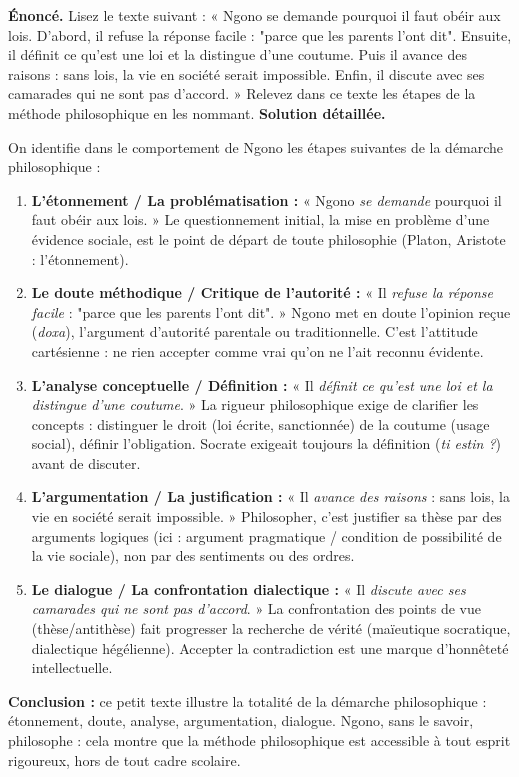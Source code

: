 \documentclass[11pt]{article}
\begin{document}
\begin{exoresolu}
\textbf{Énoncé.} Lisez le texte suivant : « Ngono se demande pourquoi il faut obéir aux lois. D'abord, il refuse la réponse facile : "parce que les parents l'ont dit". Ensuite, il définit ce qu'est une loi et la distingue d'une coutume. Puis il avance des raisons : sans lois, la vie en société serait impossible. Enfin, il discute avec ses camarades qui ne sont pas d'accord. » Relevez dans ce texte les étapes de la méthode philosophique en les nommant.
\tcblower
\textbf{Solution détaillée.}

On identifie dans le comportement de Ngono les étapes suivantes de la démarche philosophique :
\begin{enumerate}
\item \textbf{L'étonnement / La problématisation :} « Ngono \emph{se demande} pourquoi il faut obéir aux lois. » Le questionnement initial, la mise en problème d'une évidence sociale, est le point de départ de toute philosophie (Platon, Aristote : l'étonnement).
\item \textbf{Le doute méthodique / Critique de l'autorité :} « Il \emph{refuse la réponse facile} : "parce que les parents l'ont dit". » Ngono met en doute l'opinion reçue (\emph{doxa}), l'argument d'autorité parentale ou traditionnelle. C'est l'attitude cartésienne : ne rien accepter comme vrai qu'on ne l'ait reconnu évidente.
\item \textbf{L'analyse conceptuelle / Définition :} « Il \emph{définit ce qu'est une loi et la distingue d'une coutume}. » La rigueur philosophique exige de clarifier les concepts : distinguer le droit (loi écrite, sanctionnée) de la coutume (usage social), définir l'obligation. Socrate exigeait toujours la définition (\emph{ti estin ?}) avant de discuter.
\item \textbf{L'argumentation / La justification :} « Il \emph{avance des raisons} : sans lois, la vie en société serait impossible. » Philosopher, c'est justifier sa thèse par des arguments logiques (ici : argument pragmatique / condition de possibilité de la vie sociale), non par des sentiments ou des ordres.
\item \textbf{Le dialogue / La confrontation dialectique :} « Il \emph{discute avec ses camarades qui ne sont pas d'accord}. » La confrontation des points de vue (thèse/antithèse) fait progresser la recherche de vérité (maïeutique socratique, dialectique hégélienne). Accepter la contradiction est une marque d'honnêteté intellectuelle.
\end{enumerate}
\textbf{Conclusion :} ce petit texte illustre la totalité de la démarche philosophique : étonnement, doute, analyse, argumentation, dialogue. Ngono, sans le savoir, philosophe : cela montre que la méthode philosophique est accessible à tout esprit rigoureux, hors de tout cadre scolaire.
\end{exoresolu}
\end{document}
